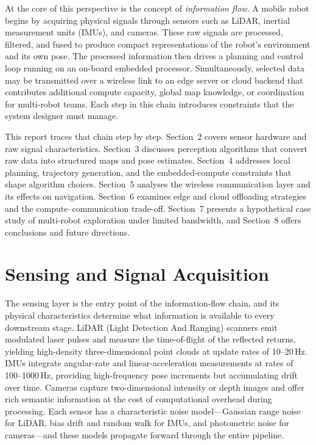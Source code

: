 At the core of this perspective is the concept of \emph{information flow}.
A mobile robot begins by acquiring physical signals through sensors such as LiDAR,
inertial measurement units (IMUs), and cameras.
These raw signals are processed, filtered, and fused to produce compact representations
of the robot's environment and its own pose.
The processed information then drives a planning and control loop running on an on-board
embedded processor.
Simultaneously, selected data may be transmitted over a wireless link to an edge server
or cloud backend that contributes additional compute capacity, global map knowledge, or
coordination for multi-robot teams.
Each step in this chain introduces constraints that the system designer must manage.

This report traces that chain step by step.
Section~2 covers sensor hardware and raw signal characteristics.
Section~3 discusses perception algorithms that convert raw data into structured maps and
pose estimates.
Section~4 addresses local planning, trajectory generation, and the embedded-compute
constraints that shape algorithm choices.
Section~5 analyses the wireless communication layer and its effects on navigation.
Section~6 examines edge and cloud offloading strategies and the compute--communication
trade-off.
Section~7 presents a hypothetical case study of multi-robot exploration under limited
bandwidth, and Section~8 offers conclusions and future directions.

\section{Sensing and Signal Acquisition}

The sensing layer is the entry point of the information-flow chain, and its physical
characteristics determine what information is available to every downstream stage.
LiDAR (Light Detection And Ranging) scanners emit modulated laser pulses and measure
the time-of-flight of the reflected returns, yielding high-density three-dimensional
point clouds at update rates of 10--20\,Hz.
IMUs integrate angular-rate and linear-acceleration measurements at rates of
100--1000\,Hz, providing high-frequency pose increments but accumulating drift over time.
Cameras capture two-dimensional intensity or depth images and offer rich semantic
information at the cost of computational overhead during processing.
Each sensor has a characteristic noise model---Gaussian range noise for LiDAR, bias
drift and random walk for IMUs, and photometric noise for cameras---and these models
propagate forward through the entire pipeline.

